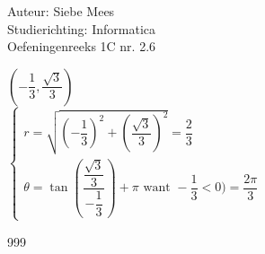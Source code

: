 \documentclass[a4paper]{article}
\begin{document}
  
\noindent \large Auteur: Siebe Mees \\
\noindent \large Studierichting: Informatica\\
\noindent \large Oefeningenreeks 1C nr. 2.6\\

\medskip

\normalsize

$ \left( -\dfrac{1}{3}, \dfrac{\sqrt{3}}{3} \right) $\\

$ \left \{
\begin{array}{l}
    r = \sqrt{(-\dfrac{1}{3})^2 + (\dfrac{\sqrt{3}}{3})^2} = \dfrac{2}{3} \\
    \theta = \tan \left( \dfrac{\dfrac{\sqrt{3}}{3}}{-\dfrac{1}{3}} \right) + \pi \text{ want }-\dfrac{1}{3} < 0) = \dfrac{2\pi}{3}
\end{array}
\right .$\\ 

\begin{thebibliography}{999}

\end{thebibliography}
\end{document}
